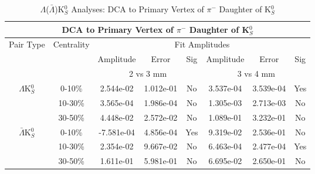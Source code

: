 \documentclass[../AnalysisNoteJBuxton.tex]{subfiles}
\begin{document}
\begin{table}
 \centering
 \begin{tabular}{|c|c|c|c|c||c|c|c|}
  \multicolumn{8}{c}{DCA to Primary Vertex of $\pi^{-}$ Daughter of K$^{0}_{S}$} \\
  \hline
  \multirow{3}{*}{Pair Type} & \multirow{3}{*}{Centrality} & \multicolumn{6}{c|}{Fit Amplitudes} \\
  \cline{3-8}
   & & Amplitude & Error & Sig & Amplitude & Error & Sig \\  
  \cline{3-8}
   & & \multicolumn{3}{c||}{2 vs 3 mm} & \multicolumn{3}{c|}{3 vs 4 mm} \\  
  \hline  
  \multirow{3}{*}{$\Lambda$K$^{0}_{S}$}  
   &  0-10\% & 2.544e-02 & 1.012e-01 & No & 3.537e-04 & 3.539e-04 & Yes \\
   & 10-30\% & 3.565e-04 & 1.986e-04 & No & 1.305e-03 & 2.713e-03 & No \\
   & 30-50\% & 4.448e-02 & 2.572e-02 & No & 1.089e-01 & 3.232e-01 & No \\
  \hline  
  \multirow{3}{*}{$\bar{\Lambda}$K$^{0}_{S}$}  
   &  0-10\% & -7.581e-04 & 4.856e-04 & Yes & 9.319e-02 & 2.536e-01 & No \\
   & 10-30\% & 2.354e-02 & 9.667e-02 & No & 6.463e-04 & 2.477e-04 & Yes \\
   & 30-50\% & 1.611e-01 & 5.981e-01 & No & 6.695e-02 & 2.650e-01 & No \\
  \hline
 \end{tabular}
 \caption{$\Lambda$($\bar{\Lambda}$)K$^{0}_{S}$ Analyses: DCA to Primary Vertex of $\pi^{-}$ Daughter of K$^{0}_{S}$}
 \label{tab:DcaToPrimVertexNegPionDaughtOfK0LamK0}
\end{table}
\end{document}
